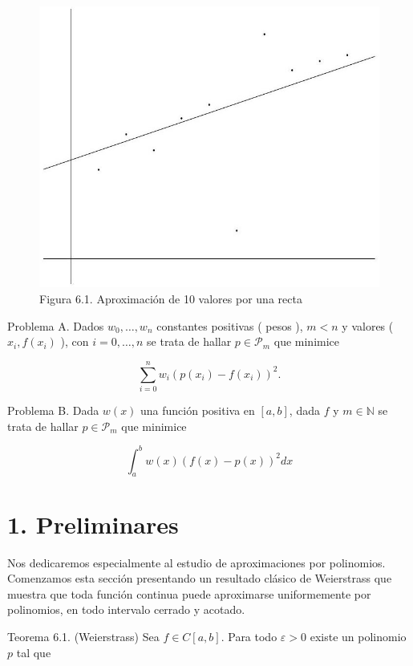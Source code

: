 \documentclass[10pt]{article}
\begin{document}
\begin{figure}[h]
\begin{center}
  \includegraphics[width=\textwidth]{2025_09_05_3888c9ac96bd653d96b4g-118}
\captionsetup{labelformat=empty}
\caption{Figura 6.1. Aproximación de 10 valores por una recta}
\end{center}
\end{figure}

Problema A. Dados $w_{0}, \ldots, w_{n}$ constantes positivas ( pesos ), $m<n$ y valores ( $x_{i}, f\left(x_{i}\right)$ ), con $i=0, \ldots, n$ se trata de hallar $p \in \mathcal{P}_{m}$ que minimice

$$
\sum_{i=0}^{n} w_{i}\left(p\left(x_{i}\right)-f\left(x_{i}\right)\right)^{2} .
$$

Problema B. Dada $w(x)$ una función positiva en $[a, b]$, dada $f$ y $m \in \mathbb{N}$ se trata de hallar $p \in \mathcal{P}_{m}$ que minimice

$$
\int_{a}^{b} w(x)(f(x)-p(x))^{2} d x
$$

\section*{1. Preliminares}
Nos dedicaremos especialmente al estudio de aproximaciones por polinomios. Comenzamos esta sección presentando un resultado clásico de Weierstrass que muestra que toda función continua puede aproximarse uniformemente por polinomios, en todo intervalo cerrado y acotado.

Teorema 6.1. (Weierstrass) Sea $f \in C[a, b]$. Para todo $\varepsilon>0$ existe un polinomio $p$ tal que
\end{document}
